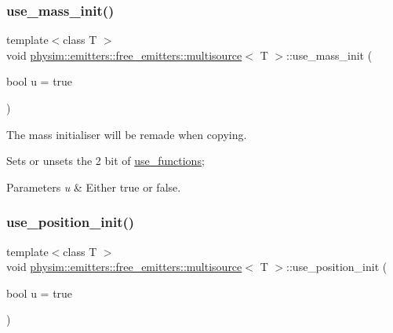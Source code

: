 \subsubsection{\texorpdfstring{use\+\_\+mass\+\_\+init()}{use\_mass\_init()}}
{\footnotesize\ttfamily template$<$class T $>$ \\
void \hyperlink{classphysim_1_1emitters_1_1free__emitters_1_1multisource}{physim\+::emitters\+::free\+\_\+emitters\+::multisource}$<$ T $>$\+::use\+\_\+mass\+\_\+init (\begin{DoxyParamCaption}\item[{bool}]{u = {\ttfamily true} }\end{DoxyParamCaption})}



The mass initialiser will be remade when copying. 

Sets or unsets the 2 bit of \hyperlink{classphysim_1_1emitters_1_1free__emitters_1_1multisource_a99bad5ac0fb5cb14652bbfd0c1f0eeff}{use\+\_\+functions}; 
\begin{DoxyParams}{Parameters}
{\em u} & Either true or false. \\
\hline
\end{DoxyParams}
\mbox{\label{classphysim_1_1emitters_1_1free__emitters_1_1multisource_a6848d75a037d33e1b8a046f51a947c19}} 
\subsubsection{\texorpdfstring{use\+\_\+position\+\_\+init()}{use\_position\_init()}}
{\footnotesize\ttfamily template$<$class T $>$ \\
void \hyperlink{classphysim_1_1emitters_1_1free__emitters_1_1multisource}{physim\+::emitters\+::free\+\_\+emitters\+::multisource}$<$ T $>$\+::use\+\_\+position\+\_\+init (\begin{DoxyParamCaption}\item[{bool}]{u = {\ttfamily true} }\end{DoxyParamCaption})}



